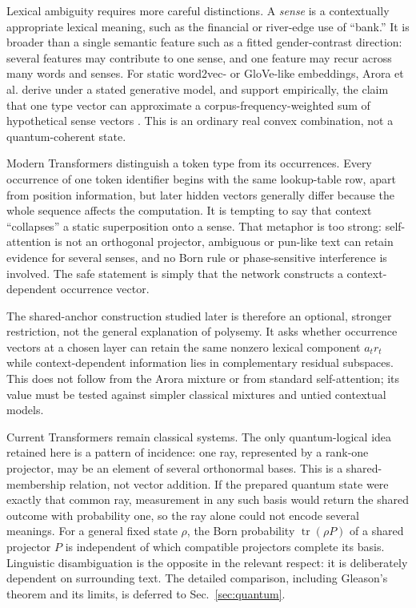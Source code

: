 \documentclass[
  aps,
  reprint,
  superscriptaddress,
  floatfix,
  nofootinbib,
  longbibliography
]{revtex4-2}
\begin{document}
Lexical ambiguity requires more careful distinctions.  A \emph{sense} is a
contextually appropriate lexical meaning, such as the financial or river-edge
use of ``bank.''  It is broader than a single semantic feature such as a fitted
gender-contrast direction: several features may contribute to one sense, and
one feature may recur across many words and senses.  For static word2vec- or
GloVe-like embeddings, Arora et al. derive under a stated generative model, and
support empirically, the claim that one type vector can approximate a
corpus-frequency-weighted sum of hypothetical sense vectors
\cite{arora-etal-2018-linear}.  This is an ordinary real convex combination,
not a quantum-coherent state.

Modern Transformers distinguish a token type from its occurrences.  Every
occurrence of one token identifier begins with the same lookup-table row,
apart from position information, but later hidden vectors generally differ
because the whole sequence affects the computation.  It is tempting to say
that context ``collapses'' a static superposition onto a sense.  That metaphor
is too strong: self-attention is not an orthogonal projector, ambiguous or
pun-like text can retain evidence for several senses, and no Born rule or
phase-sensitive interference is involved.  The safe statement is simply that
the network constructs a context-dependent occurrence vector.

The shared-anchor construction studied later is therefore an optional,
stronger restriction, not the general explanation of polysemy.  It asks
whether occurrence vectors at a chosen layer can retain the same nonzero
lexical component $a_t r_t$ while context-dependent information lies in
complementary residual subspaces.  This does not follow from the Arora mixture
or from standard self-attention; its value must be tested against simpler
classical mixtures and untied contextual models.

Current Transformers remain classical systems.  The only quantum-logical
idea retained here is a pattern of incidence: one ray, represented by a
rank-one projector, may be an element of several orthonormal bases.  This is a
shared-membership relation, not vector addition.  If the prepared quantum
state were exactly that common ray, measurement in any such basis would return
the shared outcome with probability one, so the ray alone could not encode
several meanings.  For a general fixed state $\rho$, the Born probability
$\operatorname{tr}(\rho P)$ of a shared projector $P$ is independent of which
compatible projectors complete its basis.  Linguistic disambiguation is the
opposite in the relevant respect: it is deliberately dependent on surrounding
text.  The detailed comparison, including Gleason's theorem and its limits, is
deferred to Sec.~\ref{sec:quantum}.
\end{document}
